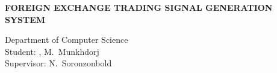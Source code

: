 \thispagestyle{plain}

\captionsetup{list=no}

\renewcommand{\figurename}{Figure}
\renewcommand{\tablename}{Table}

\vspace*{-6mm}
\begin{center}
\textbf{\large FOREIGN EXCHANGE TRADING SIGNAL GENERATION SYSTEM}\\[1mm]
\end{center}

\begin{flushright}
Department of Computer Science\\
Student: \studentID, M.~Munkhdorj\\
Supervisor: N.~Soronzonbold
\end{flushright}

